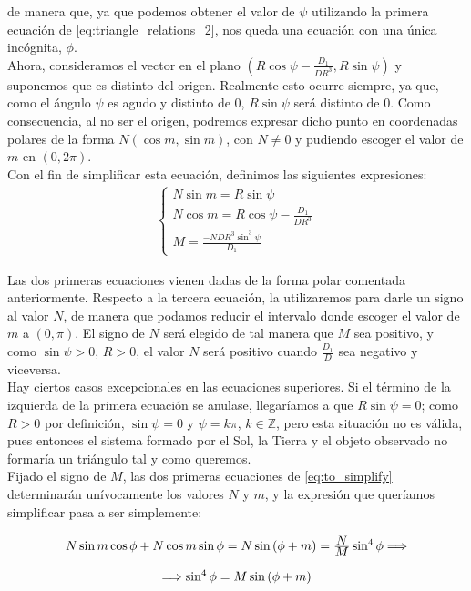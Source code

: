 \documentclass[11pt]{article}
\newcommand\ddfrac[2]{\frac{\displaystyle #1}{\displaystyle #2}}
\begin{document}
\noindent de manera que, ya que podemos obtener el valor de $\psi$ utilizando la primera ecuación de \eqref{eq:triangle_relations_2}, nos queda una ecuación con una única incógnita, $\phi$.\\

Ahora, consideramos el vector en el plano $(R\cos{\psi}-\ddfrac{D_1}{DR^3},R\sin{\psi})$ y suponemos que es distinto del origen. Realmente esto ocurre siempre, ya que, como el ángulo $\psi$ es agudo y distinto de $0$, $R\sin{\psi}$ será distinto de $0$. Como consecuencia, al no ser el origen, podremos expresar dicho punto en coordenadas polares de la forma $N(\cos{m},\sin{m})$, con $N\neq0$ y pudiendo escoger el valor de $m$ en $(0,2\pi)$.\\

Con el fin de simplificar esta ecuación, definimos las siguientes expresiones:
\begin{align}
\left\{
\begin{array}{l}
	N\sin{m}=R\sin{\psi}\\
	N\cos{m}=R\cos{\psi}-\ddfrac{D_1}{DR^3}\\
	M=\ddfrac{-NDR^3\sin^3{\psi}}{D_1}
\end{array}
\right.
\label{eq:to_simplify}
\end{align}

Las dos primeras ecuaciones vienen dadas de la forma polar comentada anteriormente. Respecto a la tercera ecuación, la utilizaremos para darle un signo al valor $N$, de manera que podamos reducir el intervalo donde escoger el valor de $m$ a $(0,\pi)$. El signo de $N$ será elegido de tal manera que $M$ sea positivo, y como $\sin{\psi}>0$, $R>0$, el valor $N$ será positivo cuando $\ddfrac{D_1}{D}$ sea negativo y viceversa.\\

Hay ciertos casos excepcionales en las ecuaciones superiores. Si el término de la izquierda de la primera ecuación se anulase, llegaríamos a que $R\sin{\psi}=0$; como $R>0$ por definición, $\sin{\psi}=0$ y $\psi=k\pi$, $k\in\mathbb{Z}$, pero esta situación no es válida, pues entonces el sistema formado por el Sol, la Tierra y el objeto observado no formaría un triángulo tal y como queremos.\\

Fijado el signo de $M$, las dos primeras ecuaciones de \eqref{eq:to_simplify} determinarán unívocamente los valores $N$ y $m$, y la expresión que queríamos simplificar pasa a ser simplemente:
\begin{align}
\def\arraystretch{2}
\begin{array}{c}
	N\sin{m}\cos{\phi}+N\cos{m}\sin{\phi}=N\sin{(\phi+m)}=\ddfrac{N}{M}\sin^4{\phi} \Longrightarrow\\
	\Longrightarrow\sin^4{\phi}=M\sin{(\phi+m)}
\end{array}
\label{eq:phi_solution}
\end{align}
\end{document}
